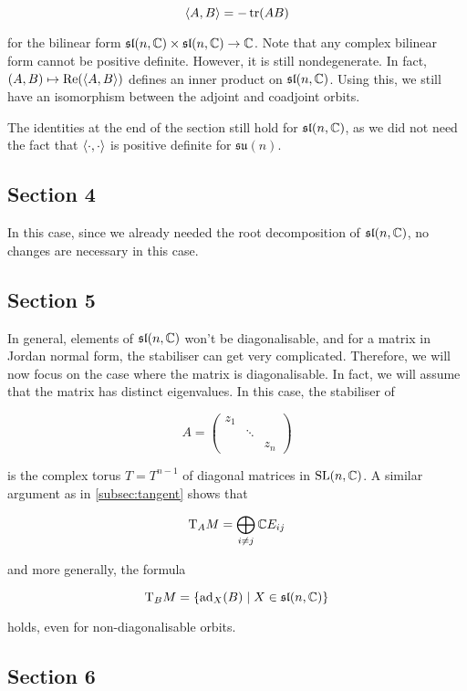 \documentclass{article}
\newcommand{\su}{\mathfrak{su}}
\renewcommand{\sl}{\mathfrak{sl}}
\begin{document}
\[\left\langle A, B \right\rangle = -\tr(AB)\]

for the bilinear form \(\sl(n, \C) \times \sl(n, \C) \to \C\). Note that any complex bilinear form cannot be positive definite. However, it is still nondegenerate. In fact, \((A, B) \mapsto \Re(\left\langle A, B \right\rangle)\) defines an inner product on \(\sl(n, \C)\). Using this, we still have an isomorphism between the adjoint and coadjoint orbits.

The identities at the end of the section still hold for \(\sl(n, \C)\), as we did not need the fact that \(\left\langle \cdot, \cdot \right\rangle\) is positive definite for \(\su(n)\).

\subsection*{Section 4}

In this case, since we already needed the root decomposition of \(\sl(n, \C)\), no changes are necessary in this case.

\subsection*{Section 5}

In general, elements of \(\sl(n, \C)\) won't be diagonalisable, and for a matrix in Jordan normal form, the stabiliser can get very complicated. Therefore, we will now focus on the case where the matrix is diagonalisable. In fact, we will assume that the matrix has distinct eigenvalues. In this case, the stabiliser of

\[A = \begin{pmatrix}
    z_1 \\
    & \ddots \\
    & & z_n
\end{pmatrix}\]

is the complex torus \(T = T^{n-1}\) of diagonal matrices in \(\operatorname{SL}(n, \mathbb{C})\). A similar argument as in \cref{subsec:tangent} shows that

\[\mathrm{T}_A M = \bigoplus_{i \ne j}\mathbb{C} E_{ij}\]

and more generally, the formula

\[\TT_B M = \left\{\ad_X(B) \mid X \in \sl(n, \C)\right\}\]

holds, even for non-diagonalisable orbits.

\subsection*{Section 6}
\end{document}
